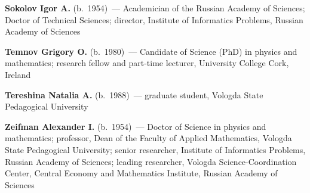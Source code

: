 \begin{multicols}{2}
\vspace*{6pt}

\noindent %
\textbf{Sokolov Igor A.} (b.\ 1954)~--- Academician of the Russian Academy of Sciences;
Doctor of Technical Sciences; director,
Institute of Informatics Problems,  Russian Academy of Sciences

\vspace*{6pt}


\noindent
\textbf{Temnov  Grigory O.} (b.\ 1980)~--- Candidate of Science (PhD) in 
physics and mathematics; research fellow and part-time lecturer,
University College Cork, Ireland

\vspace*{6pt}

\noindent
\textbf{Tereshina Natalia A.} (b.\ 1988)~--- graduate student, Vologda State
Pedagogical University


\vspace*{6pt}

\noindent
\textbf{Zeifman Alexander I.} (b.\ 1954)~--- Doctor of Science in physics and 
mathematics; professor, Dean of the Faculty of Applied Mathematics, Vologda State 
Pedagogical University; senior researcher, Institute of Informatics Problems, Russian Academy 
of Sciences; leading researcher, Vologda Science-Coordination Center, Central Economy and 
Mathematics Institute, Russian Academy of Sciences





\end{multicols}